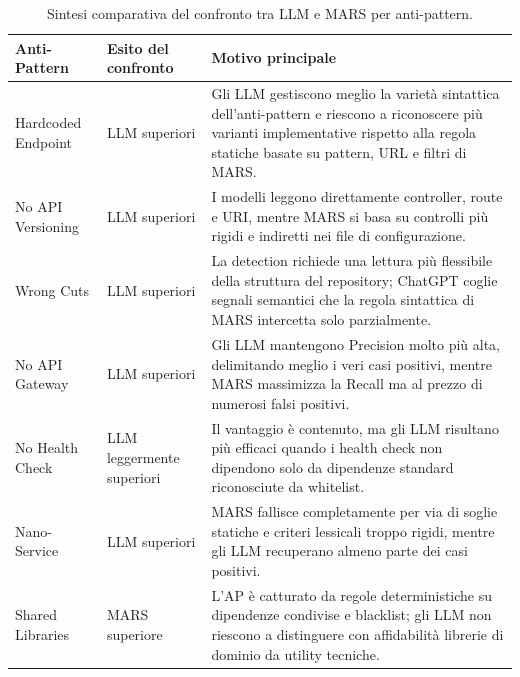 \begin{table}[H]
\centering
\scriptsize
\renewcommand{\arraystretch}{1.2}
\caption{Sintesi comparativa del confronto tra LLM e MARS per anti-pattern.}
\label{tab:rq2_summary_comparison}
\begin{tabular}{| >{\raggedright\arraybackslash}p{3.4cm} | >{\raggedright\arraybackslash}p{3.0cm} | >{\raggedright\arraybackslash}p{7.8cm} |}
\hline
\textbf{Anti-Pattern} & \textbf{Esito del confronto} & \textbf{Motivo principale} \\ \hline

Hardcoded Endpoint & LLM superiori & Gli LLM gestiscono meglio la varietà sintattica dell'anti-pattern e riescono a riconoscere più varianti implementative rispetto alla regola statiche basate su pattern, URL e filtri di MARS. \\ \hline

No API Versioning & LLM superiori & I modelli leggono direttamente controller, route e URI, mentre MARS si basa su controlli più rigidi e indiretti nei file di configurazione. \\ \hline

Wrong Cuts & LLM superiori & La detection richiede una lettura più flessibile della struttura del repository; ChatGPT coglie segnali semantici che la regola sintattica di MARS intercetta solo parzialmente. \\ \hline

No API Gateway & LLM superiori & Gli LLM mantengono Precision molto più alta, delimitando meglio i veri casi positivi, mentre MARS massimizza la Recall ma al prezzo di numerosi falsi positivi. \\ \hline

No Health Check & LLM leggermente superiori & Il vantaggio è contenuto, ma gli LLM risultano più efficaci quando i health check non dipendono solo da dipendenze standard riconosciute da whitelist. \\ \hline

Nano-Service & LLM superiori & MARS fallisce completamente per via di soglie statiche e criteri lessicali troppo rigidi, mentre gli LLM recuperano almeno parte dei casi positivi. \\ \hline

Shared Libraries & MARS superiore & L'AP è catturato da regole deterministiche su dipendenze condivise e blacklist; gli LLM non riescono a distinguere con affidabilità librerie di dominio da utility tecniche. \\ \hline


\end{tabular}
\end{table}

